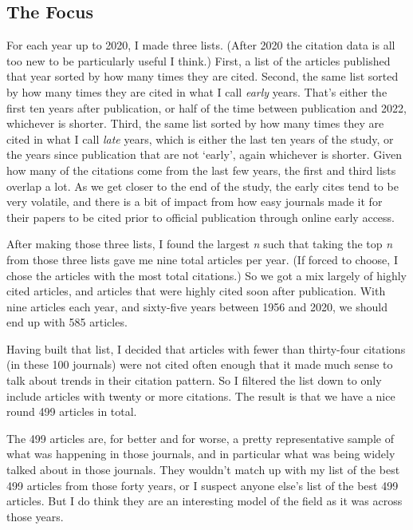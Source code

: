 \documentclass[
  10pt,
  letterpaper,
  DIV=11,
  numbers=noendperiod,
  twoside]{scrartcl}
\begin{document}
\subsection{The Focus}\label{sec-focus}

For each year up to 2020, I made three lists. (After 2020 the citation
data is all too new to be particularly useful I think.) First, a list of
the articles published that year sorted by how many times they are
cited. Second, the same list sorted by how many times they are cited in
what I call \emph{early} years. That's either the first ten years after
publication, or half of the time between publication and 2022, whichever
is shorter. Third, the same list sorted by how many times they are cited
in what I call \emph{late} years, which is either the last ten years of
the study, or the years since publication that are not `early', again
whichever is shorter. Given how many of the citations come from the last
few years, the first and third lists overlap a lot. As we get closer to
the end of the study, the early cites tend to be very volatile, and
there is a bit of impact from how easy journals made it for their papers
to be cited prior to official publication through online early access.

After making those three lists, I found the largest \emph{n} such that
taking the top \emph{n} from those three lists gave me nine total
articles per year. (If forced to choose, I chose the articles with the
most total citations.) So we got a mix largely of highly cited articles,
and articles that were highly cited soon after publication. With nine
articles each year, and sixty-five years between 1956 and 2020, we
should end up with 585 articles.

Having built that list, I decided that articles with fewer than
thirty-four citations (in these 100 journals) were not cited often
enough that it made much sense to talk about trends in their citation
pattern. So I filtered the list down to only include articles with
twenty or more citations. The result is that we have a nice round 499
articles in total.

The 499 articles are, for better and for worse, a pretty representative
sample of what was happening in those journals, and in particular what
was being widely talked about in those journals. They wouldn't match up
with my list of the best 499 articles from those forty years, or I
suspect anyone else's list of the best 499 articles. But I do think they
are an interesting model of the field as it was across those years.
\end{document}
